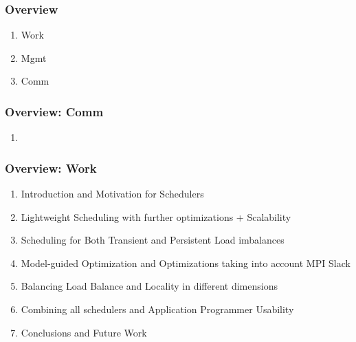 





\begin{frame}
\frametitle{Overview} 
\begin{enumerate} 
\item Work 
\item Mgmt
\item Comm 
\end{enumerate} 
\end{frame} 

%

\begin{frame}
\frametitle{Overview: Comm}
\begin{enumerate} 
\tiny \item \tiny 
\end{enumerate} 

\end{frame} 

\begin{frame}
\frametitle{Overview: Work}
\begin{enumerate}
\item Introduction and Motivation for Schedulers
\item Lightweight Scheduling with further optimizations + Scalability 
\item Scheduling for Both Transient and Persistent Load imbalances
\item Model-guided Optimization and Optimizations taking into account MPI Slack
\item Balancing Load Balance and Locality in different dimensions
\item Combining all schedulers and Application Programmer Usability
\item Conclusions and Future Work
\end{enumerate}
\end{frame}

